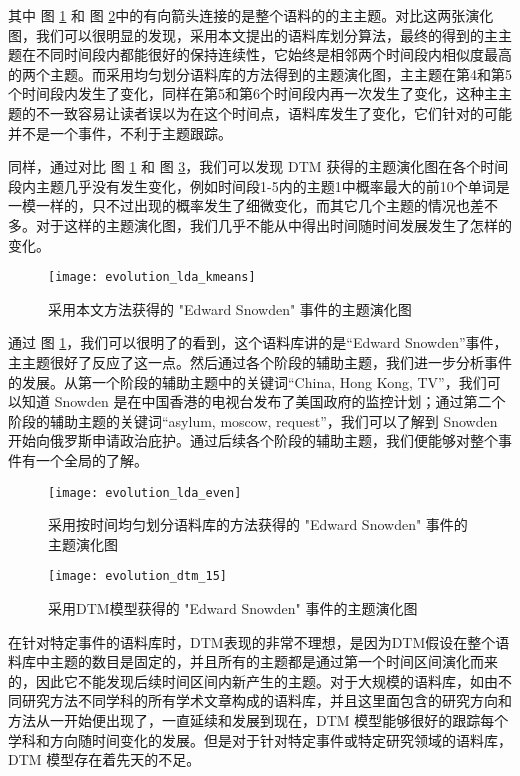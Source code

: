 其中 图 \ref{fig:evolution-our} 和 图 \ref{fig:evolution-even}中的有向箭头连接的是整个语料的的主主题。对比这两张演化图，我们可以很明显的发现，采用本文提出的语料库划分算法，最终的得到的主主题在不同时间段内都能很好的保持连续性，它始终是相邻两个时间段内相似度最高的两个主题。而采用均匀划分语料库的方法得到的主题演化图，主主题在第4和第5个时间段内发生了变化，同样在第5和第6个时间段内再一次发生了变化，这种主主题的不一致容易让读者误以为在这个时间点，语料库发生了变化，它们针对的可能并不是一个事件，不利于主题跟踪。

同样，通过对比 图 \ref{fig:evolution-our} 和 图 \ref{fig:evolution-dtm}，我们可以发现 DTM 获得的主题演化图在各个时间段内主题几乎没有发生变化，例如时间段1-5内的主题1中概率最大的前10个单词是一模一样的，只不过出现的概率发生了细微变化，而其它几个主题的情况也差不多。对于这样的主题演化图，我们几乎不能从中得出时间随时间发展发生了怎样的变化。

\begin{figure}[htb]
	\centering
	\texttt{[image: evolution\_lda\_kmeans]}
	\caption{采用本文方法获得的 "Edward Snowden" 事件的主题演化图}
	\label{fig:evolution-our}
\end{figure}

通过 图 \ref{fig:evolution-our}，我们可以很明了的看到，这个语料库讲的是“Edward Snowden”事件，主主题很好了反应了这一点。然后通过各个阶段的辅助主题，我们进一步分析事件的发展。从第一个阶段的辅助主题中的关键词“China, Hong Kong, TV”，我们可以知道 Snowden 是在中国香港的电视台发布了美国政府的监控计划；通过第二个阶段的辅助主题的关键词“asylum, moscow, request”，我们可以了解到 Snowden 开始向俄罗斯申请政治庇护。通过后续各个阶段的辅助主题，我们便能够对整个事件有一个全局的了解。

\begin{figure}[htb]
	\centering
	\texttt{[image: evolution\_lda\_even]}
	\caption{采用按时间均匀划分语料库的方法获得的 "Edward Snowden" 事件的主题演化图}
	\label{fig:evolution-even}
\end{figure}
\begin{figure}[htb]
	\centering
	\texttt{[image: evolution\_dtm\_15]}
	\caption{采用DTM模型获得的 "Edward Snowden" 事件的主题演化图}
	\label{fig:evolution-dtm}
\end{figure}
在针对特定事件的语料库时，DTM表现的非常不理想，是因为DTM假设在整个语料库中主题的数目是固定的，并且所有的主题都是通过第一个时间区间演化而来的，因此它不能发现后续时间区间内新产生的主题。对于大规模的语料库，如由不同研究方法不同学科的所有学术文章构成的语料库，并且这里面包含的研究方向和方法从一开始便出现了，一直延续和发展到现在，DTM 模型能够很好的跟踪每个学科和方向随时间变化的发展。但是对于针对特定事件或特定研究领域的语料库，DTM 模型存在着先天的不足。

